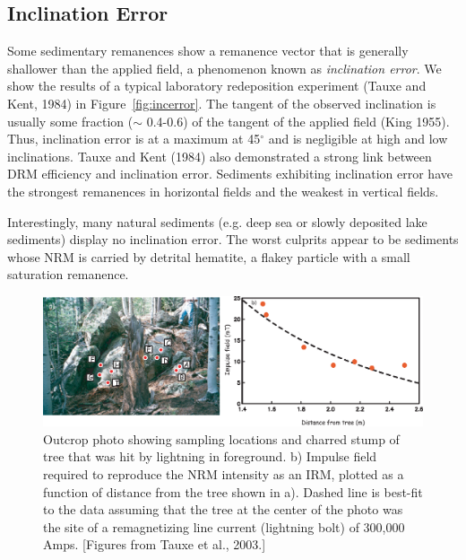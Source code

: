  
\subsection{Inclination Error}

Some sedimentary remanences  show a remanence vector that is
generally shallower than the applied field,
 a phenomenon known as
{\it inclination error}.  We show the results of a typical laboratory redeposition experiment 
(Tauxe and Kent, 1984) \nocite{tauxe84}  in Figure~\ref{fig:incerror}.  The tangent of the observed inclination is usually
some fraction ($\sim$ 0.4-0.6) of the tangent of the applied field 
(King 1955).   \nocite{king55} 
 Thus, inclination error is at a
maximum at 45$^{\circ}$ and is negligible at high and low inclinations.   Tauxe and Kent (1984) also demonstrated a strong link between DRM efficiency and inclination error.  Sediments exhibiting inclination error have the strongest remanences in horizontal fields and the weakest in vertical fields.   

Interestingly,  many natural sediments (e.g.
 deep sea or slowly deposited lake sediments) display no
inclination error.   The worst culprits appear to be sediments whose NRM is carried by detrital hematite, a flakey particle with a small saturation remanence.  


 \begin{figure}[htb]
 \centering  \includegraphics[width=14 cm]{EPSfiles/lightning.eps}
 \caption{Outcrop photo showing sampling locations and charred stump of tree that was hit by lightning in foreground.  b) Impulse field required to reproduce the NRM intensity as an IRM, plotted as a function of distance from the tree shown in
a). Dashed line is best-fit to the data assuming that the tree at the center of the photo was the site of a remagnetizing
line current (lightning bolt) of 300,000 Amps. [Figures from Tauxe et al., 2003.]}
 \label{fig:lightning}
 \end{figure} \nocite{tauxe03b}

